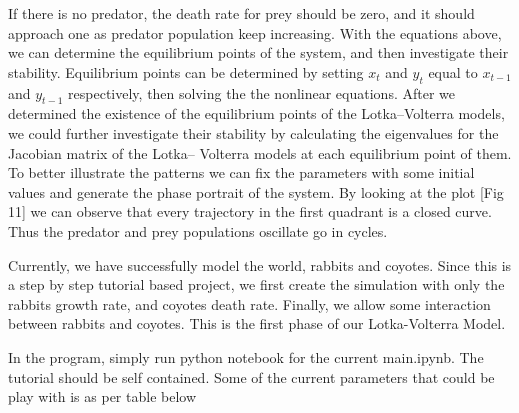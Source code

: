\documentclass{article}
\begin{document}
\begin{normalsize}
		If there is no predator, the death rate for prey should be zero, and it should approach one as predator population keep increasing. With the equations above, we can determine the equilibrium points of the system, and then investigate their stability. Equilibrium points can be determined by setting $x_{t}$ and $y_{t}$ equal to $x_{t-1}$ and $y_{t-1}$ respectively, then solving the the nonlinear equations. After we determined the existence of the equilibrium points of the Lotka–Volterra models, we could further investigate their stability by calculating the eigenvalues for the Jacobian matrix of the Lotka– Volterra models at each equilibrium point of them. To better illustrate the patterns we can fix the parameters with some initial values and generate the phase portrait of the system. By looking at the plot [Fig 11] we can observe that every trajectory in the first quadrant is a closed curve. Thus the predator and prey populations oscillate go in cycles.
		
		Currently, we have successfully model the world, rabbits and coyotes. Since this is a step by step tutorial based project, we first create the simulation with only the rabbits growth rate, and coyotes death rate. Finally, we allow some interaction between rabbits and coyotes. This is the first phase of our Lotka-Volterra Model.
		
		In the program, simply run python notebook for the current main.ipynb. The tutorial should be self contained. Some of the current parameters that could be play with is as per table below
		

\end{normalsize}
\end{document}
